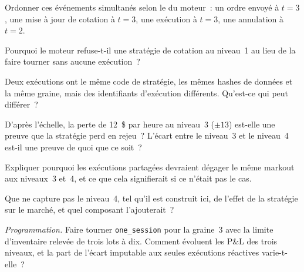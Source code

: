 \begin{exercise}[$\star$]\label{exo:pl:backtest-engine-architecture:1}
Ordonner ces événements simultanés selon le  du moteur~: un ordre envoyé à $t = 3$, une mise à jour de cotation à $t = 3$, une exécution à $t = 3$, une
annulation à $t = 2$.
\end{exercise}

\begin{exercise}[$\star$]\label{exo:pl:backtest-engine-architecture:2}
Pourquoi le moteur refuse-t-il une stratégie de cotation au niveau~1 au lieu de la faire tourner sans aucune exécution~?
\end{exercise}

\begin{exercise}[$\star$]\label{exo:pl:backtest-engine-architecture:3}
Deux exécutions ont le même code de stratégie, les mêmes hashes de données et la même graine, mais des identifiants d'exécution différents. Qu'est-ce qui peut différer~?
\end{exercise}

\begin{exercise}[$\star\star$]\label{exo:pl:backtest-engine-architecture:4}
D'après l'échelle, la perte de 12~\$ par heure au niveau~3 ($\pm 13$) est-elle une preuve que la stratégie perd en rejeu~? L'écart
entre le niveau~3 et le niveau~4 est-il une preuve de quoi que ce soit~?
\end{exercise}

\begin{exercise}[$\star\star$]\label{exo:pl:backtest-engine-architecture:5}
Expliquer pourquoi les exécutions partagées devraient dégager le même markout aux niveaux~3 et~4, et ce que cela signifierait si ce n'était pas le cas.
\end{exercise}

\begin{exercise}[$\star\star$]\label{exo:pl:backtest-engine-architecture:6}
Que ne capture pas le niveau~4, tel qu'il est construit ici, de l'effet de la stratégie sur le marché, et quel composant l'ajouterait~?
\end{exercise}

\begin{exercise}[$\star\star\star$]\label{exo:pl:backtest-engine-architecture:7}
\emph{Programmation.} Faire tourner \texttt{one\_session} pour la graine~3 avec la limite d'inventaire relevée de trois lots à dix. Comment évoluent les
P\&L des trois niveaux, et la part de l'écart imputable aux seules exécutions réactives varie-t-elle~?
\end{exercise}

